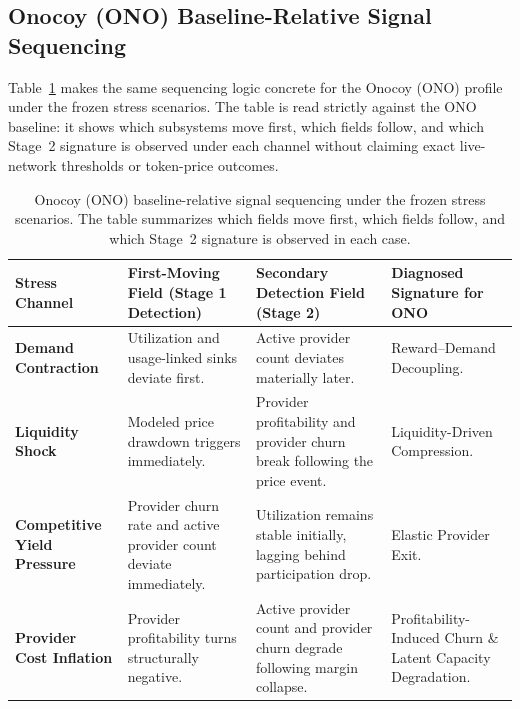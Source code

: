\subsection{Onocoy (ONO) Baseline-Relative Signal Sequencing}
\label{subsec:ono_signal_sequencing}
Table~\ref{tab:dtse_ono_signal_sequencing} makes the same sequencing logic concrete for the Onocoy (ONO) profile under the frozen stress scenarios. The table is read strictly against the ONO baseline: it shows which subsystems move first, which fields follow, and which Stage~2 signature is observed under each channel without claiming exact live-network thresholds or token-price outcomes.

\begin{table}[ht]
    \centering
    \footnotesize
    \setlength{\tabcolsep}{3pt}
    \renewcommand{\arraystretch}{1.3}
    \begin{tabularx}{\textwidth}{@{}
      >{\raggedright\arraybackslash}p{}
      >{\raggedright\arraybackslash}p{}
      >{\raggedright\arraybackslash}p{}
      >{\raggedright\arraybackslash}X
    @{}}
    \toprule
    \textbf{Stress Channel} & \textbf{First-Moving Field (Stage 1 Detection)} & \textbf{Secondary Detection Field (Stage 2)} & \textbf{Diagnosed Signature for ONO} \\
    \midrule
    \textbf{Demand Contraction} & Utilization and usage-linked sinks deviate first. & Active provider count deviates materially later. & Reward--Demand Decoupling. \\
    \addlinespace
    \textbf{Liquidity Shock} & Modeled price drawdown triggers immediately. & Provider profitability and provider churn break following the price event. & Liquidity-Driven Compression. \\
    \addlinespace
    \textbf{Competitive Yield Pressure} & Provider churn rate and active provider count deviate immediately. & Utilization remains stable initially, lagging behind participation drop. & Elastic Provider Exit. \\
    \addlinespace
    \textbf{Provider Cost Inflation} & Provider profitability turns structurally negative. & Active provider count and provider churn degrade following margin collapse. & Profitability-Induced Churn \& Latent Capacity Degradation. \\
    \bottomrule
    \end{tabularx}
    \caption[Onocoy (ONO) baseline-relative signal sequencing]{Onocoy (ONO) baseline-relative signal sequencing under the frozen stress scenarios. The table summarizes which fields move first, which fields follow, and which Stage~2 signature is observed in each case.}
    \label{tab:dtse_ono_signal_sequencing}
\end{table}

